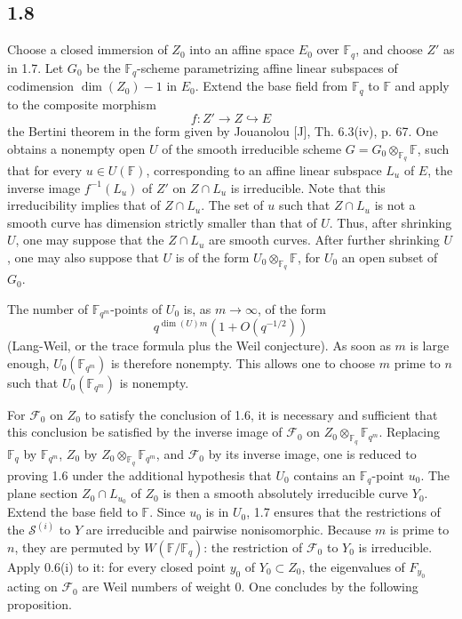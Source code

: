 \documentclass[11pt]{article}
\newcommand{\F}{\mathbb{F}}
\begin{document}
\subsection*{1.8}
Choose a closed immersion of $Z_0$ into an affine space $E_0$ over $\F_q$, and choose $Z'$ as in 1.7.
Let $G_0$ be the $\F_q$-scheme parametrizing affine linear subspaces of codimension $\dim(Z_0)-1$ in $E_0$.
Extend the base field from $\F_q$ to $\F$ and apply to the composite morphism
\[
 f:Z'\to Z\hookrightarrow E
\]
the Bertini theorem in the form given by Jouanolou [J], Th. 6.3(iv), p. 67.
One obtains a nonempty open $U$ of the smooth irreducible scheme $G=G_0\otimes_{\F_q}\F$, such that for every $u\in U(\F)$, corresponding to an affine linear subspace $L_u$ of $E$, the inverse image $f^{-1}(L_u)$ of $Z'$ on $Z\cap L_u$ is irreducible.
Note that this irreducibility implies that of $Z\cap L_u$.
The set of $u$ such that $Z\cap L_u$ is not a smooth curve has dimension strictly smaller than that of $U$.
Thus, after shrinking $U$, one may suppose that the $Z\cap L_u$ are smooth curves.
After further shrinking $U$, one may also suppose that $U$ is of the form $U_0\otimes_{\F_q}\F$, for $U_0$ an open subset of $G_0$.

The number of $\F_{q^m}$-points of $U_0$ is, as $m\to\infty$, of the form
\[
 q^{\dim(U)m}\left(1+O(q^{-1/2})\right)
\]
(Lang-Weil, or the trace formula plus the Weil conjecture).
As soon as $m$ is large enough, $U_0(\F_{q^m})$ is therefore nonempty.
This allows one to choose $m$ prime to $n$ such that $U_0(\F_{q^m})$ is nonempty.

For $\mathcal F_0$ on $Z_0$ to satisfy the conclusion of 1.6, it is necessary and sufficient that this conclusion be satisfied by the inverse image of $\mathcal F_0$ on $Z_0\otimes_{\F_q}\F_{q^m}$.
Replacing $\F_q$ by $\F_{q^m}$, $Z_0$ by $Z_0\otimes_{\F_q}\F_{q^m}$, and $\mathcal F_0$ by its inverse image, one is reduced to proving 1.6 under the additional hypothesis that $U_0$ contains an $\F_q$-point $u_0$.
The plane section $Z_0\cap L_{u_0}$ of $Z_0$ is then a smooth absolutely irreducible curve $Y_0$.
Extend the base field to $\F$.
Since $u_0$ is in $U_0$, 1.7 ensures that the restrictions of the $\mathcal S^{(i)}$ to $Y$ are irreducible and pairwise nonisomorphic.
Because $m$ is prime to $n$, they are permuted by $W(\F/\F_q)$: the restriction of $\mathcal F_0$ to $Y_0$ is irreducible.
Apply 0.6(i) to it: for every closed point $y_0$ of $Y_0\subset Z_0$, the eigenvalues of $F_{y_0}$ acting on $\mathcal F_0$ are Weil numbers of weight $0$.
One concludes by the following proposition.
\end{document}
